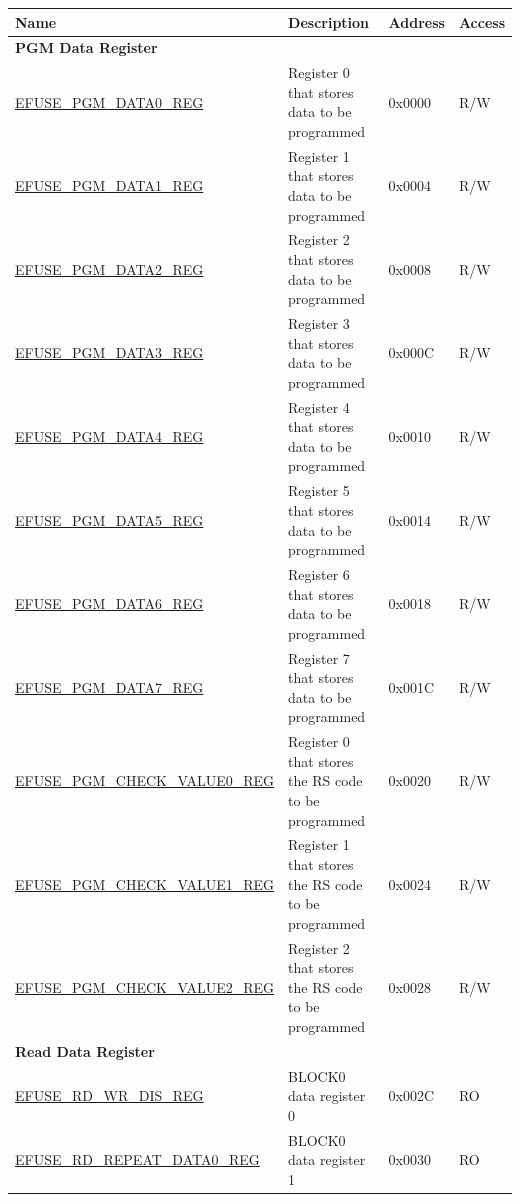 \begin{longtable}{ | p{6cm} | p{7.2cm} | p{1.3cm} | p{1cm} | }
\hline\rowcolor{lightgray}
Name & Description &  Address & Access \\ \hline
\endhead
\multicolumn{4}{|l|}{\textbf{PGM Data Register}} \\ \hline
\hyperref[regdesc:EFUSEPGMDATA0REG]{EFUSE\_PGM\_DATA0\_REG} & Register 0 that stores data to be programmed & 0x0000 & R/W \\ \hline
\hyperref[regdesc:EFUSEPGMDATA1REG]{EFUSE\_PGM\_DATA1\_REG} & Register 1 that stores data to be programmed & 0x0004 & R/W \\ \hline
\hyperref[regdesc:EFUSEPGMDATA2REG]{EFUSE\_PGM\_DATA2\_REG} & Register 2 that stores data to be programmed & 0x0008 & R/W \\ \hline
\hyperref[regdesc:EFUSEPGMDATA3REG]{EFUSE\_PGM\_DATA3\_REG} & Register 3 that stores data to be programmed & 0x000C & R/W \\ \hline
\hyperref[regdesc:EFUSEPGMDATA4REG]{EFUSE\_PGM\_DATA4\_REG} & Register 4 that stores data to be programmed & 0x0010 & R/W \\ \hline
\hyperref[regdesc:EFUSEPGMDATA5REG]{EFUSE\_PGM\_DATA5\_REG} & Register 5 that stores data to be programmed & 0x0014 & R/W \\ \hline
\hyperref[regdesc:EFUSEPGMDATA6REG]{EFUSE\_PGM\_DATA6\_REG} & Register 6 that stores data to be programmed & 0x0018 & R/W \\ \hline
\hyperref[regdesc:EFUSEPGMDATA7REG]{EFUSE\_PGM\_DATA7\_REG} & Register 7 that stores data to be programmed & 0x001C & R/W \\ \hline
\hyperref[regdesc:EFUSEPGMCHECKVALUE0REG]{EFUSE\_PGM\_CHECK\_VALUE0\_REG} & Register 0 that stores the RS code to be programmed & 0x0020 & R/W \\ \hline
\hyperref[regdesc:EFUSEPGMCHECKVALUE1REG]{EFUSE\_PGM\_CHECK\_VALUE1\_REG} & Register 1 that stores the RS code to be programmed & 0x0024 & R/W \\ \hline
\hyperref[regdesc:EFUSEPGMCHECKVALUE2REG]{EFUSE\_PGM\_CHECK\_VALUE2\_REG} & Register 2 that stores the RS code to be programmed & 0x0028 & R/W \\ \hline
\multicolumn{4}{|l|}{\textbf{Read Data Register}} \\ \hline
\hyperref[regdesc:EFUSERDWRDISREG]{EFUSE\_RD\_WR\_DIS\_REG} & BLOCK0 data register 0 & 0x002C & RO \\ \hline
\hyperref[regdesc:EFUSERDREPEATDATA0REG]{EFUSE\_RD\_REPEAT\_DATA0\_REG} & BLOCK0 data register 1 & 0x0030 & RO \\ \hline

\end{longtable}
